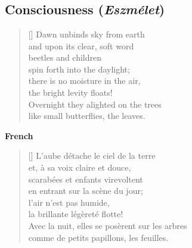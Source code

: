 \documentclass[a4paper,12pt,twoside,final]{book}
\begin{document}

\chapter{}


\section{Consciousness (\emph{Eszmélet})}


\settowidth{\versewidth}{Overnight they alighted on the trees}

\begin{verse}[\versewidth]
  Dawn unbinds sky from earth \\
  and upon its clear, soft word \\
  beetles and children \\
  spin forth into the daylight; \\
  there is no moisture in the air, \\
  the bright levity floats! \\
  Overnight they alighted on the trees \\
  like small butterflies, the leaves. \\
\end{verse}

\noindent \textbf{French}


\settowidth{\versewidth}{Avec la nuit, elles se posèrent sur les arbres}

\begin{verse}[\versewidth]
  L'aube détache le ciel de la terre \\
  et, à sa voix claire et douce, \\
  scarabées et enfants virevoltent \\
  en entrant sur la scène du jour; \\
  l'air n'est pas humide, \\
  la brillante légèreté flotte! \\
  Avec la nuit, elles se posèrent sur les arbres \\
  comme de petits papillons, les feuilles. \\
\end{verse}
\end{document}
